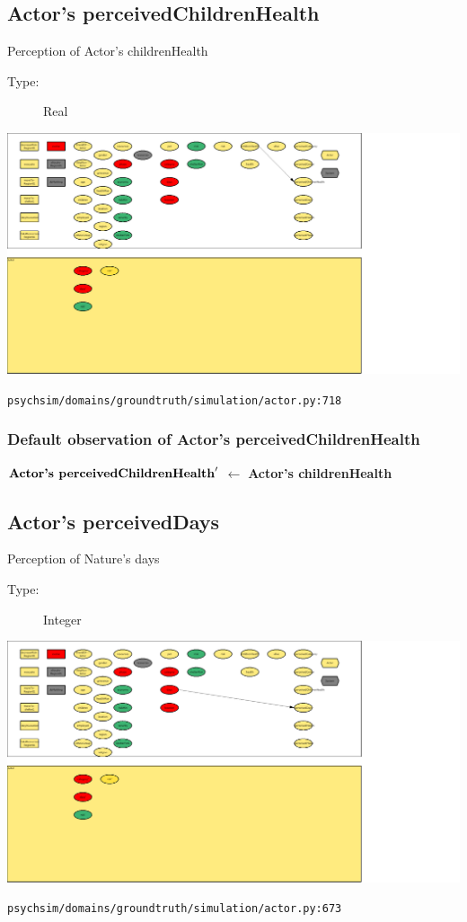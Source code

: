 \documentclass{article}%
\begin{document}
\subsection{Actor's perceivedChildrenHealth}%
\label{subsec:Actor's perceivedChildrenHealth}%
Perception of Actor's childrenHealth%
\begin{description}%
\item[Type:]%
Real%
\end{description}%
\includegraphics[width=\textwidth]{images/perceivedChildrenHealthOfActor.png}%
\begin{flushleft}%
\verb|psychsim/domains/groundtruth/simulation/actor.py:718|%
\end{flushleft}%
\subsubsection{Default observation of Actor's perceivedChildrenHealth}%
\label{ssubsec:Default observation of Actor's perceivedChildrenHealth}%
\begin{flushleft}%
$\mbox{\textbf{Actor's perceivedChildrenHealth}} '$%
$\leftarrow$%
\textbf{Actor's childrenHealth}%
\end{flushleft}

%
\subsection{Actor's perceivedDays}%
\label{subsec:Actor's perceivedDays}%
Perception of Nature's days%
\begin{description}%
\item[Type:]%
Integer%
\end{description}%
\includegraphics[width=\textwidth]{images/perceivedDaysOfActor.png}%
\begin{flushleft}%
\verb|psychsim/domains/groundtruth/simulation/actor.py:673|%
\end{flushleft}%
\end{document}
